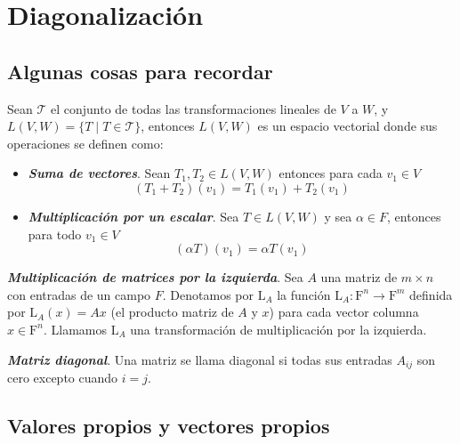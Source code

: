 \documentclass{report}
\begin{document}
    \tableofcontents
    \pagebreak
    \chapter{ Diagonalización }
    
    \section{Algunas cosas para recordar}
    
    \begin{defBox}
        Sean $\mathcal{T}$ el conjunto de todas las transformaciones lineales de $V$ a $W$, y $L(V,W) = \{T \mid T \in \mathcal{T}\}$, entonces $L(V,W)$ es un espacio vectorial donde sus operaciones se definen como:
        
        \begin{itemize}
            \item \textit{\textbf{Suma de vectores}}. Sean $T_1, T_2 \in L(V,W)$ entonces para cada $v_1 \in V$
            $$(T_1+T_2)(v_1) = T_1(v_1) + T_2(v_1)$$
            \item \textit{\textbf{Multiplicación por un escalar}}. Sea $T \in L(V,W)$ y sea $\alpha \in F$, entonces para todo $v_1 \in V$
            $$(\alpha T)(v_1) = \alpha T(v_1)$$
        \end{itemize}
    \end{defBox}
    
    \begin{defBox}
        \textit{\textbf{Multiplicación de matrices por la izquierda}}. Sea $A$ una matriz de $m \times n$ con entradas de un campo $F$. Denotamos por $\mathrm{L}_A$ la función $\mathrm{L}_A: \mathrm{F}^n \rightarrow \mathrm{F}^m$ definida por $\mathrm{L}_A(x)=A x$ (el producto matriz de $A$ y $x$) para cada vector columna $x \in \mathrm{F}^n$. Llamamos $\mathrm{L}_A$ una transformación de multiplicación por la izquierda.
    \end{defBox}
    
    \begin{defBox}
        \textit{\textbf{Matriz diagonal}}. Una matriz se llama diagonal si todas sus entradas $A_{ij}$ son cero excepto cuando $i = j$.
    \end{defBox}
    
    \section{Valores propios y vectores propios}
    
\end{document}
